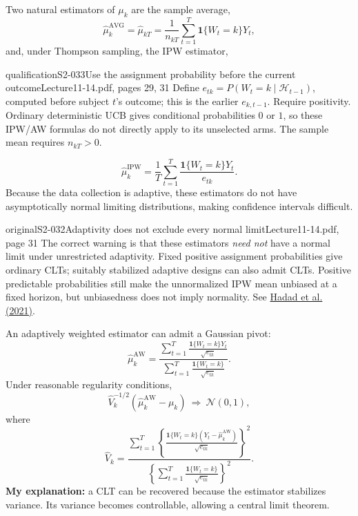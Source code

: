 Two natural estimators of $\mu_k$ are the sample average,
\[
 \widehat\mu_k^{\mathrm{AVG}}=\widehat\mu_{kT}
 =\frac1{n_{kT}}\sum_{t=1}^T\mathbf1\{W_t=k\}Y_t,\tag{14.11}
\]
and, under Thompson sampling, the IPW estimator,

\begin{reviewnote}{qualification}{S2-033}{Use the assignment probability before the current outcome}{Lecture11-14.pdf, pages 29, 31}
Define $e_{tk}=P(W_t=k\mid\mathcal H_{t-1})$, computed before subject $t$'s outcome; this is the earlier $e_{k,t-1}$. Require positivity. Ordinary deterministic UCB gives conditional probabilities $0$ or $1$, so these IPW/AW formulas do not directly apply to its unselected arms. The sample mean requires $n_{kT}>0$.
\end{reviewnote}

\[
 \widehat\mu_k^{\mathrm{IPW}}=\frac1T\sum_{t=1}^T
 \frac{\mathbf1\{W_t=k\}Y_t}{e_{tk}}.\tag{14.12}
\]
Because the data collection is adaptive, these estimators do not have asymptotically normal limiting distributions, making confidence intervals difficult.
\begin{reviewnote}{original}{S2-032}{Adaptivity does not exclude every normal limit}{Lecture11-14.pdf, page 31}
The correct warning is that these estimators \emph{need not} have a normal limit under unrestricted adaptivity. Fixed positive assignment probabilities give ordinary CLTs; suitably stabilized adaptive designs can also admit CLTs. Positive predictable probabilities still make the unnormalized IPW mean unbiased at a fixed horizon, but unbiasedness does not imply normality. See \href{https://pmc.ncbi.nlm.nih.gov/articles/PMC8054003/}{Hadad et al. (2021)}.
\end{reviewnote}


An adaptively weighted estimator can admit a Gaussian pivot:
\[
 \widehat\mu_k^{\mathrm{AW}}
 =\frac{\displaystyle\sum_{t=1}^T
 \frac{\mathbf1\{W_t=k\}Y_t}{\sqrt{e_{tk}}}}
 {\displaystyle\sum_{t=1}^T
 \frac{\mathbf1\{W_t=k\}}{\sqrt{e_{tk}}}}.\tag{14.13}
\]
Under reasonable regularity conditions,
\[
 \widehat V_k^{-1/2}(\widehat\mu_k^{\mathrm{AW}}-\mu_k)
 \ \Rightarrow\ \mathcal N(0,1),
\]
where
\[
 \widehat V_k=
 \frac{\displaystyle\sum_{t=1}^T
 \left\{\frac{\mathbf1\{W_t=k\}(Y_t-\widehat\mu_k^{\mathrm{AW}})}
 {\sqrt{e_{tk}}}\right\}^{\!2}}
 {\displaystyle\left\{\sum_{t=1}^T
 \frac{\mathbf1\{W_t=k\}}{\sqrt{e_{tk}}}\right\}^{\!2}}.\tag{14.14}
\]
\textbf{My explanation:} a CLT can be recovered because the estimator stabilizes variance. Its variance becomes controllable, allowing a central limit theorem.

